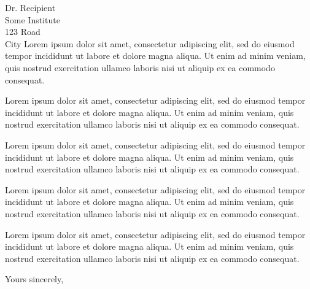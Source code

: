 \documentclass{letter}
\begin{document}
\begin{letter}{Dr. Recipient \\ Some Institute \\ 123 Road \\ City}
Lorem ipsum dolor sit amet, consectetur adipiscing elit, sed do eiusmod tempor incididunt ut labore et dolore magna aliqua. Ut enim ad minim veniam, quis nostrud exercitation ullamco laboris nisi ut aliquip ex ea commodo consequat.

Lorem ipsum dolor sit amet, consectetur adipiscing elit, sed do eiusmod tempor incididunt ut labore et dolore magna aliqua. Ut enim ad minim veniam, quis nostrud exercitation ullamco laboris nisi ut aliquip ex ea commodo consequat.

Lorem ipsum dolor sit amet, consectetur adipiscing elit, sed do eiusmod tempor incididunt ut labore et dolore magna aliqua. Ut enim ad minim veniam, quis nostrud exercitation ullamco laboris nisi ut aliquip ex ea commodo consequat.

Lorem ipsum dolor sit amet, consectetur adipiscing elit, sed do eiusmod tempor incididunt ut labore et dolore magna aliqua. Ut enim ad minim veniam, quis nostrud exercitation ullamco laboris nisi ut aliquip ex ea commodo consequat.

Lorem ipsum dolor sit amet, consectetur adipiscing elit, sed do eiusmod tempor incididunt ut labore et dolore magna aliqua. Ut enim ad minim veniam, quis nostrud exercitation ullamco laboris nisi ut aliquip ex ea commodo consequat.

\closing{Yours sincerely,}
\end{letter}
\end{document}
